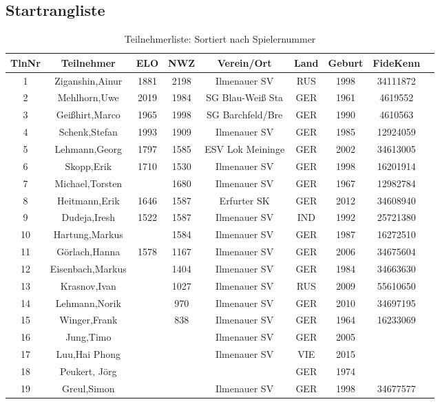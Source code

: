 \documentclass[a4paper,ngerman]{tui-algo-seminar}
\begin{document}
\subsection{Startrangliste}
\begin{table}[H]
\centering
\caption{Teilnehmerliste: Sortiert nach Spielernummer}
\begin{tabular}{ccccccccc}
\hline
\textbf{TlnNr} & \textbf{Teilnehmer} & \textbf{ELO} & \textbf{NWZ} & \textbf{Verein/Ort} & \textbf{Land} & \textbf{Geburt} & \textbf{FideKenn} \\
\hline
1 & Ziganshin,Ainur & 1881 & 2198 & Ilmenauer SV & RUS & 1998 & 34111872 \\
2 & Mehlhorn,Uwe & 2019 & 1984 & SG Blau-Weiß Sta & GER & 1961 & 4619552 \\
3 & Geißhirt,Marco & 1965 & 1998 & SG Barchfeld/Bre & GER & 1990 & 4610563 \\
4 & Schenk,Stefan & 1993 & 1909 & Ilmenauer SV & GER & 1985 & 12924059 \\
5 & Lehmann,Georg & 1797 & 1585 & ESV Lok Meininge & GER & 2002 & 34613005 \\
6 & Skopp,Erik & 1710 & 1530 & Ilmenauer SV & GER & 1998 & 16201914 \\
7 & Michael,Torsten & & 1680 & Ilmenauer SV & GER & 1967 & 12982784 \\
8 & Heitmann,Erik & 1646 & 1587 & Erfurter SK & GER & 2012 & 34608940 \\
9 & Dudeja,Iresh & 1522 & 1587 & Ilmenauer SV & IND & 1992 & 25721380 \\
10 & Hartung,Markus & & 1584 & Ilmenauer SV & GER & 1987 & 16272510 \\
11 & Görlach,Hanna & 1578 & 1167 & Ilmenauer SV & GER & 2006 & 34675604 \\
12 & Eisenbach,Markus & & 1404 & Ilmenauer SV & GER & 1984 & 34663630 \\
13 & Krasnov,Ivan & & 1027 & Ilmenauer SV & RUS & 2009 & 55610650 \\
14 & Lehmann,Norik & & 970 & Ilmenauer SV & GER & 2010 & 34697195 \\
15 & Winger,Frank & & 838 & Ilmenauer SV & GER & 1964 & 16233069 \\
16 & Jung,Timo & & & Ilmenauer SV & GER & 2005 & \\
17 & Luu,Hai Phong & & & Ilmenauer SV & VIE & 2015 & \\
18 & Peukert, Jörg & & & & GER & 1974 & \\
19 & Greul,Simon & & & Ilmenauer SV & GER & 1998 & 34677577 \\
\hline
\end{tabular}
\end{table}
\end{document}
